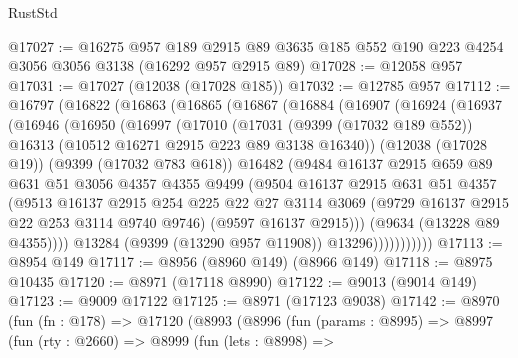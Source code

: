 \begin{lexlean}{RustStd}
\begin{coremodule}
@17027 := @16275
    @957
    @189
    @2915
    @89
    @3635
    @185
    @552
    @190
    @223
    @4254
    @3056
    @3056
    @3138
    (@16292 @957 @2915 @89)
@17028 := @12058 @957
@17031 := @17027 (@12038 (@17028 @185))
@17032 := @12785 @957
@17112 := @16797
    (@16822
      (@16863
        (@16865
          (@16867
            (@16884
              (@16907
                (@16924
                  (@16937
                    (@16946
                      (@16950
                        (@16997
                          (@17010
                            (@17031
                              (@9399 (@17032 @189 @552))
                              @16313
                              (@10512 @16271 @2915 @223 @89 @3138 @16340))
                            (@12038 (@17028 @19))
                            (@9399 (@17032 @783 @618))
                            @16482
                            (@9484
                              @16137
                              @2915
                              @659
                              @89
                              @631
                              @51
                              @3056
                              @4357
                              @4355
                              @9499
                              (@9504
                                @16137
                                @2915
                                @631
                                @51
                                @4357
                                (@9513
                                  @16137
                                  @2915
                                  @254
                                  @225
                                  @22
                                  @27
                                  @3114
                                  @3069
                                  (@9729 @16137 @2915 @22 @253 @3114 @9740 @9746)
                                  (@9597 @16137 @2915)))
                              (@9634 (@13228 @89 @4355))))
                          @13284
                          (@9399 (@13290 @957 @11908))
                          @13296)))))))))))
@17113 := @8954 @149
@17117 := @8956 (@8960 @149) (@8966 @149)
@17118 := @8975 @10435
@17120 := @8971 (@17118 @8990)
@17122 := @9013 (@9014 @149)
@17123 := @9009 @17122
@17125 := @8971 (@17123 @9038)
@17142 := @8970
    (fun (fn : @178) =>
    @17120
      (@8993
        (@8996
          (fun (params : @8995) =>
          @8997
            (fun (rty : @2660) =>
            @8999
              (fun (lets : @8998) =>

\end{coremodule}
\end{lexlean}

